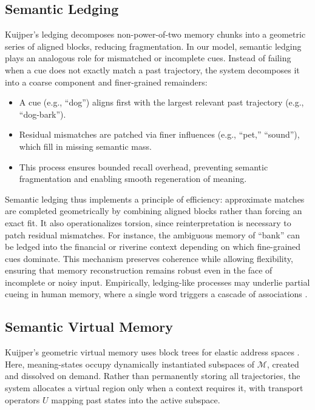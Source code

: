 \documentclass[a4paper,12pt]{article}
\newcommand{\M}{\mathcal{M}}
\begin{document}
\subsection{Semantic Ledging}
Kuijper’s ledging \citep{kuijper2021geometric} decomposes non-power-of-two memory chunks into a geometric series of aligned blocks, reducing fragmentation. In our model, semantic ledging plays an analogous role for mismatched or incomplete cues. Instead of failing when a cue does not exactly match a past trajectory, the system decomposes it into a coarse component and finer-grained remainders:
\begin{itemize}
    \item A cue (e.g., ``dog'') aligns first with the largest relevant past trajectory (e.g., ``dog-bark'').
    \item Residual mismatches are patched via finer influences (e.g., ``pet,'' ``sound''), which fill in missing semantic mass.
    \item This process ensures bounded recall overhead, preventing semantic fragmentation and enabling smooth regeneration of meaning.
\end{itemize}
Semantic ledging thus implements a principle of efficiency: approximate matches are completed geometrically by combining aligned blocks rather than forcing an exact fit. It also operationalizes torsion, since reinterpretation is necessary to patch residual mismatches. For instance, the ambiguous memory of ``bank'' can be ledged into the financial or riverine context depending on which fine-grained cues dominate. This mechanism preserves coherence while allowing flexibility, ensuring that memory reconstruction remains robust even in the face of incomplete or noisy input. Empirically, ledging-like processes may underlie partial cueing in human memory, where a single word triggers a cascade of associations \citep{squire1992memory}.

\subsection{Semantic Virtual Memory}
Kuijper’s geometric virtual memory uses block trees for elastic address spaces \citep{kuijper2021geometric}. Here, meaning-states occupy dynamically instantiated subspaces of $\M$, created and dissolved on demand. Rather than permanently storing all trajectories, the system allocates a virtual region only when a context requires it, with transport operators $U$ mapping past states into the active subspace.
\end{document}
